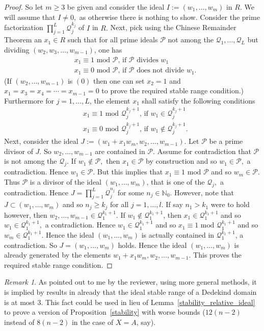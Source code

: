 \documentclass[12pt]{amsart}
\newcommand{\C}[1]{{\mathcal #1}}
\theoremstyle{definition}\newtheorem{definition}[theorem]{Definition}
\theoremstyle{remark}\newtheorem{remark}[theorem]{Remark}
\theoremstyle{definition}\newtheorem{case}{Case}
\begin{document}
\begin{proof}
So let $m\geq 3$ be given and consider the ideal $I:=(w_1,\dots,w_m)$ in $R.$ We will assume that $I\neq 0,$ as otherwise there is nothing to show. Consider the prime factorization $\prod_{j=1}^L \C Q_j^{k_j}$ of $I$ in $R.$ Next, pick using the Chinese Remainder Theorem an $x_1\in R$ such that for all prime ideals $\C P$ not among the $\C Q_1,\dots,\C Q_L$ but dividing $(w_2,w_3,\dots,w_{m-1})$, one has
\begin{align*}
&x_1\equiv 1\text{ mod }\C P\text{, if }\C P\text{ divides }w_1\\
&x_1\equiv 0\text{ mod }\C P\text{, if }\C P\text{ does not divide }w_1.
\end{align*}
(If $(w_2,\dots,w_{m-1})$ is $(0)$ then one can set $x_2=1$ and $x_1=x_3=x_4=\cdots=x_{m-1}=0$ to prove the required stable range condition.) Furthermore for $j=1,\dots,L$, the element $x_1$ shall satisfy the following conditions
\begin{align*}
&x_1\equiv 1\text{ mod }\C Q_j^{k_j+1}\text{, if }w_1\in\C Q_j^{k_j+1}\\
&x_1\equiv 0\text{ mod }\C Q_j^{k_j+1}\text{, if }w_1\notin\C Q_j^{k_j+1}.
\end{align*}
Next, consider the ideal $J:=(w_1+x_1w_m,w_2,\dots,w_{m-1}).$ Let $\C P$ be a prime divisor of $J$. So $w_2,\dots,w_{m-1}$ are contained in $\C P.$ Assume for contradiction that $\C P$ is not among the $\C Q_j.$ If $w_1\notin\C P,$ then $x_1\in\C P$ by construction and so $w_1\in\C P,$ a contradiction. Hence $w_1\in\C P.$ But this implies that $x_1\equiv 1\text{ mod }\C P$ and so $w_m\in\C P.$ Thus $\C P$ is a divisor of the ideal $(w_1,\dots,w_m)$, that is one of the $\C Q_j,$ a contradiction. Hence $J=\prod_{j=1}^L\C Q_j^{n_j}$ for some $n_j\in\mathbb{N}_0.$ However, note that $J\subset (w_1,\dots,w_m)$ and so $n_j\geq k_j$ for all $j=1,\dots,l.$ If say $n_1>k_1$ were to hold however, then $w_2,\dots,w_{m-1}\in\C Q_1^{k_1+1}.$ If $w_1\notin\C Q_1^{k_1+1}$, then $x_1\in\C Q_1^{k_1+1}$ and so $w_1\in\C Q_1^{k_1+1},$ a contradiction. Hence $w_1\in\C Q_1^{k_1+1}$ and so $x_1\equiv 1\text{ mod }\C Q_1^{k_1+1}$ and so $w_m\in\C Q_1^{k_1+1}.$ Hence the ideal $(w_1,\dots,w_m)$ is actually contained in $\C Q_1^{k_1+1}$, a contradiction. So $J=(w_1,\dots,w_m)$ holds. Hence the ideal $(w_1,\dots,w_m)$ is already generated by the elements $w_1+x_1w_m,w_2,\dots,w_{m-1}.$ This proves the required stable range condition.
\end{proof}

\begin{remark}
As pointed out to me by the reviewer, using more general methods, it is implied by results in \cite{stepanov1989stable} already that the ideal stable range of a Dedekind domain is at most $3.$ This fact could be used in lieu of Lemma~\ref{stability_relative_ideal} to prove a version of Proposition~\ref{stability} with worse bounds ($12(n-2)$ instead of $8(n-2)$ in the case of $X=A$, say).
\end{remark}
\end{document}
